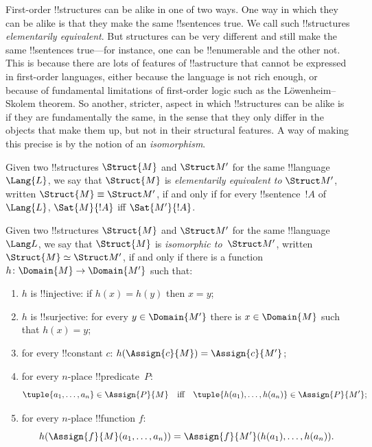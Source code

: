 \documentclass[../../../include/open-logic-section]{subfiles}
\begin{document}

First-order !!{structure}s can be alike in one of two ways. One way in
which they can be alike is that they make the same !!{sentence}s
true. We call such !!{structure}s \emph{elementarily equivalent}. But
structures can be very different and still make the same !!{sentence}s
true---for instance, one can be !!{enumerable} and the other not.
This is because there are lots of features of !!a{structure} that
cannot be expressed in first-order languages, either because the
language is not rich enough, or because of fundamental limitations of
first-order logic such as the L\"owenheim--Skolem theorem. So another,
stricter, aspect in which !!{structure}s can be alike is if they are
fundamentally the same, in the sense that they only differ in the
objects that make them up, but not in their structural features. A way
of making this precise is by the notion of an \emph{isomorphism}.

\begin{defn}
Given two !!{structure}s $\Struct{M}$ and $\Struct M'$ for the same
!!{language}~$\Lang{L}$, we say that $\Struct{M}$ is \emph{elementarily
  equivalent to} $\Struct M'$, written $\Struct{M} \equiv \Struct M'$,
if and only if for every !!{sentence}~$!A$ of~$\Lang{L}$,
$\Sat{M}{!A}$ iff $\Sat{M'}{!A}$.
\end{defn}

\begin{defn}
 Given two !!{structure}s $\Struct{M}$ and
$\Struct M'$ for the same !!{language}~$\Lang L$, we say that
$\Struct{M}$ is \emph{isomorphic to}~$\Struct M'$, written $\Struct{M}
\simeq \Struct M'$, if and only if there is a function $h \colon
\Domain{M} \to \Domain{M'}$ such that:
\begin{enumerate}
\item $h$ is !!{injective}: if $h(x) =
  h(y)$ then $x = y$; 
\item $h$ is !!{surjective}: for every $y \in \Domain{M'}$ there
  is $x \in \Domain{M}$ such that $h(x) = y$;
\item {}for every !!{constant} $c$:
  $h(\Assign{c}{M}) = \Assign{c}{M'}$;
\item {}for every $n$-place !!{predicate}~$P$:
  \[
  \tuple{a_1, \dots, a_n}\in \Assign{P}{M} \quad\text{iff}\quad
  \tuple{h(a_1), \dots, h(a_n)} \in \Assign{P}{M'};
  \]
\item {}for every $n$-place !!{function} $f$:
  \[
  h(\Assign{f}{M}(a_1, \dots, a_n)) =
  \Assign{f}{M'}(h(a_1), \dots, h(a_n)).
  \]
\end{enumerate}
\end{defn}
\end{document}
